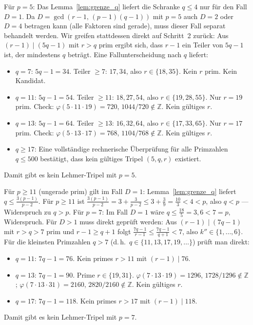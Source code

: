 \documentclass[12pt,a4paper]{amsart}
\theoremstyle{definition}
\begin{document}
Für $p = 5$: Das Lemma~\ref{lem:grenze_q} liefert die Schranke $q \le 4$ nur für den Fall $D = 1$.
Da $D = \gcd(r-1,\, (p-1)(q-1))$ mit $p=5$ auch $D = 2$ oder $D = 4$ betragen kann
(alle Faktoren sind gerade), muss dieser Fall separat behandelt werden.
Wir greifen stattdessen direkt auf Schritt~2 zurück: Aus $(r-1) \mid (5q-1)$ mit $r > q$ prim ergibt sich,
dass $r - 1$ ein Teiler von $5q - 1$ ist, der mindestens $q$ beträgt.
Eine Fallunterscheidung nach $q$ liefert:
\begin{itemize}
  \item $q = 7$: $5q-1 = 34$. Teiler $\ge 7$: $17, 34$, also $r \in \{18, 35\}$. Kein $r$ prim. Kein Kandidat.
  \item $q = 11$: $5q-1 = 54$. Teiler $\ge 11$: $18, 27, 54$, also $r \in \{19, 28, 55\}$. Nur $r = 19$ prim.
        Check: $\varphi(5 \cdot 11 \cdot 19) = 720$, $1044 / 720 \notin \mathbb{Z}$. Kein gültiges $r$.
  \item $q = 13$: $5q-1 = 64$. Teiler $\ge 13$: $16, 32, 64$, also $r \in \{17, 33, 65\}$. Nur $r = 17$ prim.
        Check: $\varphi(5 \cdot 13 \cdot 17) = 768$, $1104 / 768 \notin \mathbb{Z}$. Kein gültiges $r$.
  \item $q \ge 17$: Eine vollständige rechnerische Überprüfung für alle Primzahlen $q \le 500$
        bestätigt, dass kein gültiges Tripel $(5, q, r)$ existiert.
\end{itemize}
Damit gibt es kein Lehmer-Tripel mit $p = 5$.

Für $p \ge 11$ (ungerade prim) gilt im Fall $D = 1$:
Lemma~\ref{lem:grenze_q} liefert $q \le \tfrac{3(p-1)}{p-2}$.
Für $p \ge 11$ ist $\tfrac{3(p-1)}{p-2} = 3 + \tfrac{3}{p-2} \le 3 + \tfrac{3}{9} = \tfrac{10}{3} < 4 < p$,
also $q < p$ — Widerspruch zu $q > p$.
Für $p = 7$: Im Fall $D = 1$ wäre $q \le \tfrac{18}{5} = 3{,}6 < 7 = p$, Widerspruch.
Für $D > 1$ muss direkt geprüft werden: Aus $(r-1) \mid (7q-1)$ mit $r > q > 7$ prim
und $r - 1 \ge q + 1$ folgt $\tfrac{7q-1}{r-1} \le \tfrac{7q-1}{q+1} < 7$,
also $k'' \in \{1, \ldots, 6\}$. Für die kleinsten Primzahlen $q > 7$
(d.\,h.\ $q \in \{11, 13, 17, 19, \ldots\}$) prüft man direkt:
\begin{itemize}
  \item $q = 11$: $7q-1 = 76$. Kein primes $r > 11$ mit $(r-1) \mid 76$.
  \item $q = 13$: $7q-1 = 90$. Prime $r \in \{19, 31\}$.
        $\varphi(7 \cdot 13 \cdot 19) = 1296$, $1728 / 1296 \notin \mathbb{Z}$;
        $\varphi(7 \cdot 13 \cdot 31) = 2160$, $2820 / 2160 \notin \mathbb{Z}$. Kein gültiges $r$.
  \item $q = 17$: $7q-1 = 118$. Kein primes $r > 17$ mit $(r-1) \mid 118$.
\end{itemize}
Damit gibt es kein Lehmer-Tripel mit $p = 7$.
\end{document}
